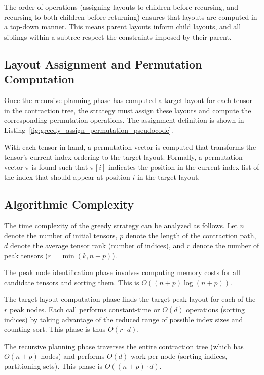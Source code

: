 The order of operations (assigning layouts to children before recursing, and recursing to both children before returning) ensures that layouts are computed in a top-down manner. This means parent layouts inform child layouts, and all siblings within a subtree respect the constraints imposed by their parent.

\subsection{Layout Assignment and Permutation Computation}

Once the recursive planning phase has computed a target layout for each tensor in the contraction tree, the strategy must assign these layouts and compute the corresponding permutation operations. The assignment definition is shown in Listing~\ref{fig:greedy_assign_permutation_pseudocode}.

With each tensor in hand, a permutation vector is computed that transforms the tensor's current index ordering to the target layout. Formally, a permutation vector $\pi$ is found such that $\pi[i]$ indicates the position in the current index list of the index that should appear at position $i$ in the target layout.

\subsection{Algorithmic Complexity}

The time complexity of the greedy strategy can be analyzed as follows. Let $n$ denote the number of initial tensors, $p$ denote the length of the contraction path, $d$ denote the average tensor rank (number of indices), and $r$ denote the number of peak tensors ($r = \min(k, n + p)$).

The peak node identification phase involves computing memory costs for all candidate tensors and sorting them. This is $O((n + p) \log(n + p))$.

The target layout computation phase finds the target peak layout for each of the $r$ peak nodes. Each call performs constant-time or $O(d)$ operations (sorting indices) by taking advantage of the reduced range of possible index sizes and counting sort. This phase is thus $O(r \cdot d)$.

The recursive planning phase traverses the entire contraction tree (which has $O(n + p)$ nodes) and performs $O(d)$ work per node (sorting indices, partitioning sets). This phase is $O((n + p) \cdot d)$.

